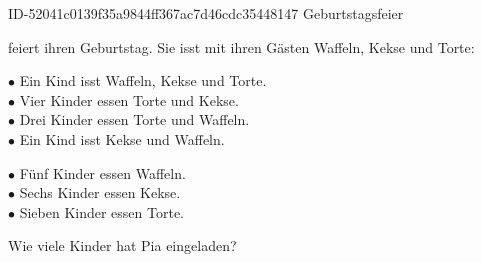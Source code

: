 \begin{exercise}
      {ID-52041c0139f35a9844ff367ac7d46cdc35448147}
      {Geburtstagsfeier}
  \ifproblem\problem\par
    \xxa{} feiert ihren Geburtstag. Sie isst mit ihren Gästen Waffeln, Kekse
    und Torte:\par
    \begin{minipage}[t]{0.52\textwidth}
      $\bullet$ Ein Kind isst Waffeln, Kekse und Torte.\\[1ex]
      $\bullet$ Vier Kinder essen Torte und Kekse.\\[1ex]
      $\bullet$ Drei Kinder essen Torte und Waffeln.\\[1ex]
      $\bullet$ Ein Kind isst Kekse und Waffeln.
    \end{minipage}\hfill
    \begin{minipage}[t]{0.45\textwidth}
      $\bullet$ Fünf Kinder essen Waffeln.\\[1ex]
      $\bullet$ Sechs Kinder essen Kekse.\\[1ex]
      $\bullet$ Sieben Kinder essen Torte.
    \end{minipage}\bigskip\par
    Wie viele Kinder hat Pia eingeladen?
  \fi
\end{exercise}
